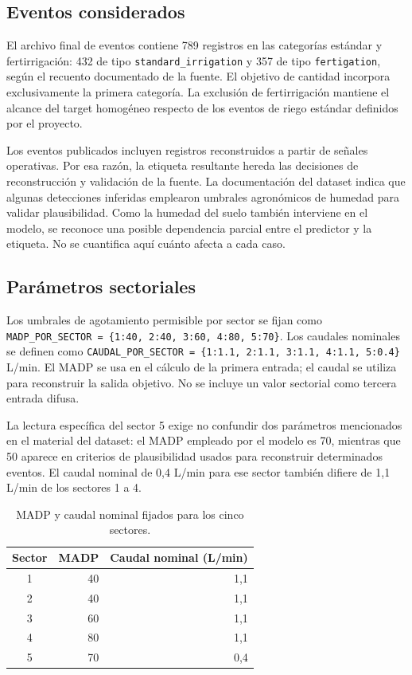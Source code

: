 \documentclass[11pt,letterpaper]{article}
\newcommand{\codigo}[1]{\texttt{\small #1}}
\begin{document}
\subsection{Eventos considerados}
El archivo final de eventos contiene 789 registros en las categorías estándar y fertirrigación: 432 de tipo \codigo{standard\_irrigation} y 357 de tipo \codigo{fertigation}, según el recuento documentado de la fuente. El objetivo de cantidad incorpora exclusivamente la primera categoría. La exclusión de fertirrigación mantiene el alcance del target homogéneo respecto de los eventos de riego estándar definidos por el proyecto.

Los eventos publicados incluyen registros reconstruidos a partir de señales operativas. Por esa razón, la etiqueta resultante hereda las decisiones de reconstrucción y validación de la fuente. La documentación del dataset indica que algunas detecciones inferidas emplearon umbrales agronómicos de humedad para validar plausibilidad. Como la humedad del suelo también interviene en el modelo, se reconoce una posible dependencia parcial entre el predictor y la etiqueta. No se cuantifica aquí cuánto afecta a cada caso.

\subsection{Parámetros sectoriales}
Los umbrales de agotamiento permisible por sector se fijan como \codigo{MADP\_POR\_SECTOR = \{1:40, 2:40, 3:60, 4:80, 5:70\}}. Los caudales nominales se definen como \codigo{CAUDAL\_POR\_SECTOR = \{1:1.1, 2:1.1, 3:1.1, 4:1.1, 5:0.4\}} L/min. El MADP se usa en el cálculo de la primera entrada; el caudal se utiliza para reconstruir la salida objetivo. No se incluye un valor sectorial como tercera entrada difusa.

La lectura específica del sector 5 exige no confundir dos parámetros mencionados en el material del dataset: el MADP empleado por el modelo es 70, mientras que 50 aparece en criterios de plausibilidad usados para reconstruir determinados eventos. El caudal nominal de 0,4 L/min para ese sector también difiere de 1,1 L/min de los sectores 1 a 4.

\begin{table}[H]
\centering
\caption{MADP y caudal nominal fijados para los cinco sectores.}\label{tab:sectores-base}
\begin{tabular}{crr}
\toprule
Sector & MADP & Caudal nominal (L/min)\\
\midrule
1 & 40 & 1,1\\
2 & 40 & 1,1\\
3 & 60 & 1,1\\
4 & 80 & 1,1\\
5 & 70 & 0,4\\
\bottomrule
\end{tabular}
\end{table}
\end{document}
